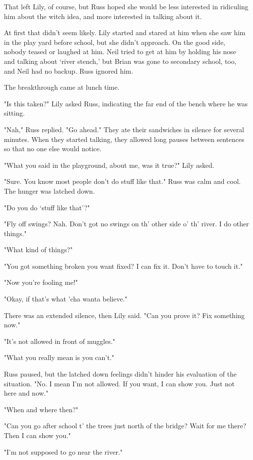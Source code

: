 That left Lily, of course, but Russ hoped she would be less interested in ridiculing him about the witch idea, and more interested in talking about it.

At first that didn't seem likely. Lily started and stared at him when she saw him in the play yard before school, but she didn't approach. On the good side, nobody teased or laughed at him. Neil tried to get at him by holding his nose and talking about `river stench,' but Brian was gone to secondary school, too, and Neil had no backup. Russ ignored him.

The breakthrough came at lunch time.

"Is this taken?" Lily asked Russ, indicating the far end of the bench where he was sitting.

"Nah," Russ replied. "Go ahead." They ate their sandwiches in silence for several minutes. When they started talking, they allowed long pauses between sentences so that no one else would notice.

"What you said in the playground, about me, was it true?" Lily asked.

"Sure. You know most people don't do stuff like that." Russ was calm and cool. The hunger was latched down.

"Do you do `stuff like that'?"

"Fly off swings? Nah. Don't got no swings on th' other side o' th' river. I do other things."

"What kind of things?"

"You got something broken you want fixed? I can fix it. Don't have to touch it."

"Now you're fooling me!"

"Okay, if that's what 'cha wanta believe."

There was an extended silence, then Lily said. "Can you prove it? Fix something now."

"It's not allowed in front of muggles."

"What you really mean is you can't."

Russ paused, but the latched down feelings didn't hinder his evaluation of the situation. "No. I mean I'm not allowed. If you want, I can show you. Just not here and now."

"When and where then?"

"Can you go after school t' the trees just north of the bridge? Wait for me there? Then I can show you."

"I'm not supposed to go near the river."

